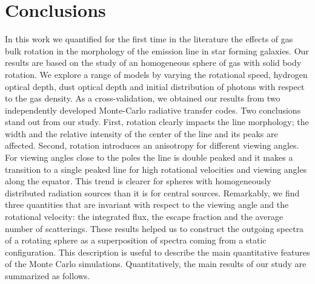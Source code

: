 
\chapter{Conclusions} %

\label{sec:conclusions} %



In this work we quantified for the first time in the literature the effects
of gas bulk rotation in the morphology of the \ly emission line in
star forming galaxies.
Our results are based on the study of an homogeneous sphere
of gas with solid body rotation.
We explore a range of models by varying the rotational speed, hydrogen
optical depth, dust optical depth and initial distribution of \ly
photons with respect to the gas density.
As a cross-validation, we obtained our results from two independently
developed Monte-Carlo radiative transfer codes.
Two conclusions stand out from our study.
First, rotation clearly impacts the \ly line morphology; the width and
the relative intensity of the center of the line and its peaks are
affected.
Second, rotation introduces an anisotropy for different viewing
angles.
For viewing angles close to the poles the line is double peaked and it
makes a transition to a single peaked line for high rotational
velocities and viewing angles along the equator.
This trend is clearer for spheres with homogeneously distributed
radiation sources than it is for central sources.
Remarkably, we find three quantities that are invariant with respect
to the viewing angle and the rotational velocity: the integrated flux,
the escape fraction and the average number of scatterings.
These results helped us to construct the outgoing spectra of a
rotating sphere as a superposition of spectra coming from a static
configuration. This description is useful to describe the main
quantitative features of the Monte Carlo simulations.
Quantitatively, the main results of our study are summarized as
follows.
